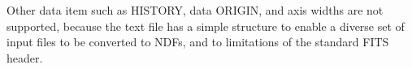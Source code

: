 {{{         \sstitem
            Other data item such as HISTORY, data ORIGIN, and axis
            widths are not supported, because the text file has a simple
            structure to enable a diverse set of input files to be
            converted to NDFs, and to limitations of the standard FITS
            header.
      }
   }
}
